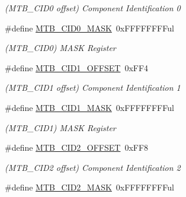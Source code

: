 \begin{DoxyCompactItemize}
\begin{DoxyCompactList}\small\item\em (M\+T\+B\+\_\+\+C\+I\+D0 offset) Component Identification 0 \end{DoxyCompactList}\item 
\hypertarget{group___s_a_m_l21___m_t_b_ga9e7f0e674b34967de0b0f12095baa2fe}{}\#define \hyperlink{group___s_a_m_l21___m_t_b_ga9e7f0e674b34967de0b0f12095baa2fe}{M\+T\+B\+\_\+\+C\+I\+D0\+\_\+\+M\+A\+S\+K}~0x\+F\+F\+F\+F\+F\+F\+F\+Ful\label{group___s_a_m_l21___m_t_b_ga9e7f0e674b34967de0b0f12095baa2fe}

\begin{DoxyCompactList}\small\item\em (M\+T\+B\+\_\+\+C\+I\+D0) M\+A\+S\+K Register \end{DoxyCompactList}\item 
\hypertarget{group___s_a_m_l21___m_t_b_ga3472f9c9e1f0a1661aba5ef3337ba1e5}{}\#define \hyperlink{group___s_a_m_l21___m_t_b_ga3472f9c9e1f0a1661aba5ef3337ba1e5}{M\+T\+B\+\_\+\+C\+I\+D1\+\_\+\+O\+F\+F\+S\+E\+T}~0x\+F\+F4\label{group___s_a_m_l21___m_t_b_ga3472f9c9e1f0a1661aba5ef3337ba1e5}

\begin{DoxyCompactList}\small\item\em (M\+T\+B\+\_\+\+C\+I\+D1 offset) Component Identification 1 \end{DoxyCompactList}\item 
\hypertarget{group___s_a_m_l21___m_t_b_gab04ffc43b8ff46bbec4d124cfbe309e7}{}\#define \hyperlink{group___s_a_m_l21___m_t_b_gab04ffc43b8ff46bbec4d124cfbe309e7}{M\+T\+B\+\_\+\+C\+I\+D1\+\_\+\+M\+A\+S\+K}~0x\+F\+F\+F\+F\+F\+F\+F\+Ful\label{group___s_a_m_l21___m_t_b_gab04ffc43b8ff46bbec4d124cfbe309e7}

\begin{DoxyCompactList}\small\item\em (M\+T\+B\+\_\+\+C\+I\+D1) M\+A\+S\+K Register \end{DoxyCompactList}\item 
\hypertarget{group___s_a_m_l21___m_t_b_ga478c06e0d8728bf541a09d9cf376d90d}{}\#define \hyperlink{group___s_a_m_l21___m_t_b_ga478c06e0d8728bf541a09d9cf376d90d}{M\+T\+B\+\_\+\+C\+I\+D2\+\_\+\+O\+F\+F\+S\+E\+T}~0x\+F\+F8\label{group___s_a_m_l21___m_t_b_ga478c06e0d8728bf541a09d9cf376d90d}

\begin{DoxyCompactList}\small\item\em (M\+T\+B\+\_\+\+C\+I\+D2 offset) Component Identification 2 \end{DoxyCompactList}\item 
\hypertarget{group___s_a_m_l21___m_t_b_ga669c770fd44f285415b226ec5d3a7baa}{}\#define \hyperlink{group___s_a_m_l21___m_t_b_ga669c770fd44f285415b226ec5d3a7baa}{M\+T\+B\+\_\+\+C\+I\+D2\+\_\+\+M\+A\+S\+K}~0x\+F\+F\+F\+F\+F\+F\+F\+Ful\label{group___s_a_m_l21___m_t_b_ga669c770fd44f285415b226ec5d3a7baa}


\end{DoxyCompactItemize}
